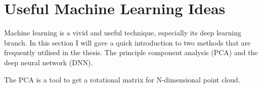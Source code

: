 \documentclass[11pt,twoside]{report}
\begin{document}
\section{Useful Machine Learning Ideas}

Machine learning is a vivid and useful technique, especially its deep learning branch. In this section I will gave a quick introduction to two methods that are frequently utilised in the thesis. The principle component analysis (PCA) and the deep neural network (DNN).

The PCA is a tool to get a rotational matrix for N-dimensional point cloud.
\end{document}
